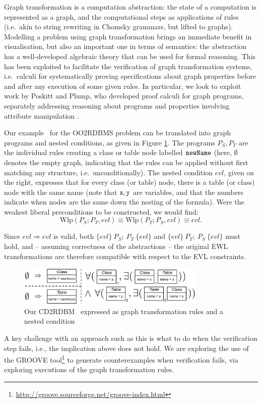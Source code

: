 	Graph transformation is a computation abstraction: the state of a computation is represented as a graph, and the computational steps as applications of rules (i.e.\ akin to string rewriting in Chomsky grammars, but lifted to graphs). Modelling a problem using graph transformation brings an immediate benefit in visualisation, but also an important one in terms of semantics: the abstraction has a well-developed algebraic theory that can be used for formal reasoning. This has been exploited to facilitate the verification of graph transformation systems, i.e.\ calculi for systematically proving specifications about graph properties before and after any execution of some given rules. In particular, we look to exploit work by Poskitt and Plump, who developed proof calculi for graph programs, separately addressing reasoning about programs and properties involving attribute manipulation \cite{Poskitt13a,Poskitt-Plump12a}.

Our example \BX\ for the OO2RDBMS problem can be translated into graph programs and nested conditions, as given in Figure \ref{fig:ex-program-constraints}. The programs $P_S,P_T$ are the individual rules creating a class or table node labelled $\tt newName$ (here, $\emptyset$ denotes the empty graph, indicating that the rules can be applied without first matching any structure, i.e.\ unconditionally). The nested condition $evl$, given on the right, expresses that for every class (or table) node, there is a table (or class) node with the same name (note that $\tt x,y$ are variables, and that the numbers indicate when nodes are the same down the nesting of the formula). Were the weakest liberal preconditions to be constructed, we would find:
	\[ \text{Wlp}(P_S;P_T,evl) \equiv \text{Wlp}(P_T;P_S,evl) \equiv evl. \]
	
	\noindent Since $evl \Rightarrow evl$ is valid, both $\{evl\}\ P_S;\ P_T\ \{evl\}$ and $\{evl\}\ P_T;\ P_S\ \{evl\}$ must hold, and -- assuming correctness of the abstractions -- the original EWL transformations are therefore compatible with respect to the EVL constraints.
	
	\begin{figure}[htb]
\vspace*{-10pt}
		\centering
		\includegraphics[width=0.8\textwidth]{ex-program-constraints.pdf}
		\caption{Our CD2RDBM \BX\ expressed as graph transformation rules and a nested condition}
\vspace*{-20pt}
		\label{fig:ex-program-constraints}
	\end{figure}

A key challenge with an approach such as this is what to do when the verification step fails, i.e., the implication above does not hold. We are exploring the use of the GROOVE tool\footnote{\url{http://groove.sourceforge.net/groove-index.html}} to generate counterexamples when verification fails, via exploring executions of the graph transformation rules.

